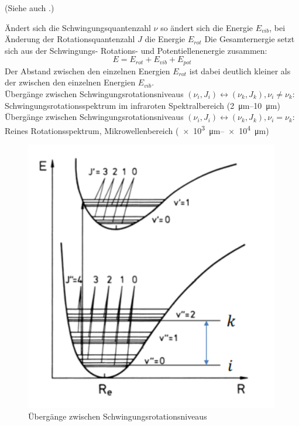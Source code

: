 \label{q:14}

(Siehe auch .)

Ändert sich die Schwingungsquantenzahl $\nu$ so ändert sich die Energie $E_{vib}$, bei Änderung der Rotationsquantenzahl $J$ die Energie $E_{rot}$ Die Gesamternergie setzt sich aus der Schwingungs- Rotations- und Potentiellenenergie zusammen:
\begin{equation}
    E = E_{rot} + E_{vib} + E_{pot}
\end{equation}
Der Abstand zwischen den einzelnen Energien $E_{rot}$ ist dabei deutlich kleiner als der zwischen den einzelnen Energien $E_{vib}$.\\
Übergänge zwischen Schwingungsrotationsniveaus $(\nu_i, J_i) \longleftrightarrow (\nu_k, J_k), \nu_i \neq \nu_k$: Schwingungsrotationsspektrum im infraroten Spektralbereich (\SIrange{2}{10}{\micro\meter})\\
Übergänge zwischen Schwingungsrotationsniveaus $(\nu_i, J_i) \longleftrightarrow (\nu_k, J_k), \nu_i = \nu_k$: Reines Rotationsspektrum, Mikrowellenbereich (\SIrange{e3}{e4}{\micro\meter})
\begin{figure}[H]
    \centering
    \includegraphics{resources/05-05-2015/Frage_14.png}
\caption{Übergänge zwischen Schwingungsrotationsniveaus}
    \label{fig:enter-label2}
\end{figure}

